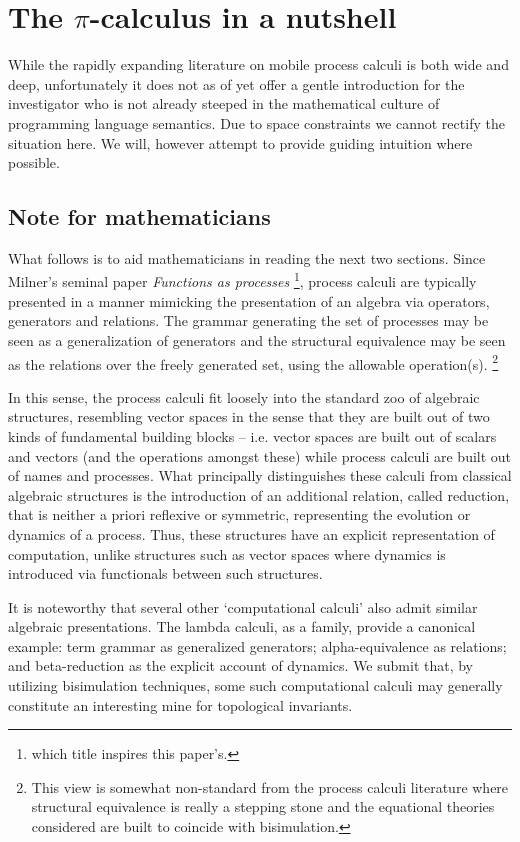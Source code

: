 \documentclass[]{llncs}
\begin{document}
\section{The $\pi$-calculus in a nutshell} \label{Pinut}

While the rapidly expanding literature on
mobile process calculi is both wide and
deep, unfortunately it does not as of yet
offer a
gentle introduction for the investigator who is not already steeped in
the mathematical culture of programming language semantics. Due
to space constraints we cannot rectify the situation here. We will,
however attempt to provide guiding intuition where possible.

\subsection{Note for
mathematicians}\label{mathnote}

What follows is to aid mathematicians in reading
the next two sections. Since
Milner's seminal paper
\textit{Functions as processes}
\cite{FunctionsAsProcesses} \footnote{which
title inspires this paper's.},
 process calculi are typically presented in a
manner mimicking the
presentation of an algebra via operators, generators
and relations. The grammar
generating the set of processes may be seen as a generalization of
generators and the structural equivalence may be seen as the relations
over the freely generated set, using the
allowable operation(s).
\footnote{This view is somewhat
  non-standard from the process calculi literature where structural
  equivalence is really a stepping stone and the equational theories
  considered are built to coincide with bisimulation.}

In this sense, the process calculi fit loosely into
the standard zoo of
algebraic structures, resembling vector spaces in the sense that they
are built out of two kinds of fundamental building blocks --
i.e. vector spaces are built out of scalars and
vectors (and the operations amongst these) while
process calculi are built out of names and processes.
What principally
distinguishes these calculi from classical
algebraic structures is
the introduction of an additional relation, called reduction, that is
neither a priori reflexive or symmetric, representing the evolution or
dynamics of a process. Thus, these structures have an explicit
representation of computation, unlike structures such as vector spaces
where dynamics is introduced via functionals
between such structures.

It is noteworthy that several other `computational calculi' also admit
similar algebraic presentations. The lambda calculi, as a family,
provide a canonical example: term grammar as generalized generators;
alpha-equivalence as relations; and beta-reduction as the explicit
account of dynamics. We submit that, by utilizing
bisimulation techniques, some such
computational calculi may generally constitute an
interesting mine for
topological invariants.
\end{document}

